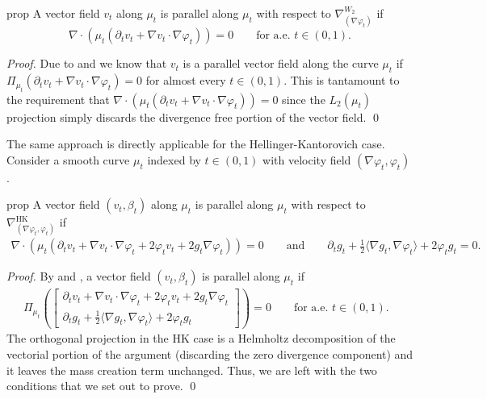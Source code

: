 \documentclass[11pt]{article}
\begin{document}
\begin{restatable}{prop}{} \label{Wasserstein parallel transport pde}
    A vector field $v_t$ along $\mu_t$ is parallel along $\mu_t$ with respect to $\nabla_{(\nabla\varphi_t)}^{W_2}$ if
    \begin{equation*}
        \boxed{\nabla \cdot \left(\mu_t\left(\partial_t v_t + \nabla v_t \cdot \nabla \varphi_t\right)\right) = 0 \qquad \text{for a.e. $t \in (0,1).$}}
    \end{equation*}
\end{restatable}
\noindent \textit{Proof.} Due to  and  we know that $v_t$ is a parallel vector field along the curve $\mu_t$ if $\Pi_{\mu_t}\left(\partial_tv_t + \nabla v_t \cdot \nabla\varphi_t\right) = 0$ for almost every $t \in (0,1).$ This is tantamount to the requirement that $\nabla \cdot \left(\mu_t(\partial_tv_t + \nabla v_t \cdot \nabla\varphi_t)\right) = 0$ since the $L_2(\mu_t)$ projection simply discards the divergence free portion of the vector field. \qed{}

The same approach is directly applicable for the Hellinger-Kantorovich case. Consider a smooth curve $\mu_t$ indexed by $t \in (0,1)$ with velocity field $(\nabla\varphi_t, \varphi_t)$. 

\begin{restatable}{prop}{} \label{HK parallel transport pde}
    A vector field $(v_t, \beta_t)$ along $\mu_t$ is parallel along $\mu_t$ with respect to $\nabla_{(\nabla\varphi_t, \varphi_t)}^{\text{HK}}$ if
    \begin{align*}
        \boxed{\nabla \cdot (\mu_t (\partial_tv_t + \nabla v_t \cdot \nabla \varphi_t + 2\varphi_t v_t + 2g_t \nabla\varphi_t)) = 0 
        \qquad \text{and} \qquad 
        \partial_tg_t + \frac{1}{2}\langle\nabla g_t, \nabla\varphi_t\rangle + 2\varphi_t g_t = 0.}
    \end{align*}
\end{restatable}
\noindent \textit{Proof.} By  and , a vector field $(v_t, \beta_t)$ is parallel along $\mu_t$ if
\begin{align}
    \Pi_{\mu_t}\left(\begin{bmatrix}
        \partial_tv_t + \nabla v_t\cdot \nabla\varphi_t + 2\varphi_tv_t +  2g_t\nabla\varphi_t \\
        \partial_tg_t + \frac{1}{2}\langle\nabla g_t, \nabla\varphi_t\rangle + 2\varphi_t g_t
    \end{bmatrix}\right) = 0 \qquad \text{for a.e. $t \in (0,1).$ }
\end{align}
The orthogonal projection in the HK case is a Helmholtz decomposition of the vectorial portion of the argument (discarding the zero divergence component) and it leaves the mass creation term unchanged. Thus, we are left with the two conditions that we set out to prove. \qed{}
\\
\end{document}
